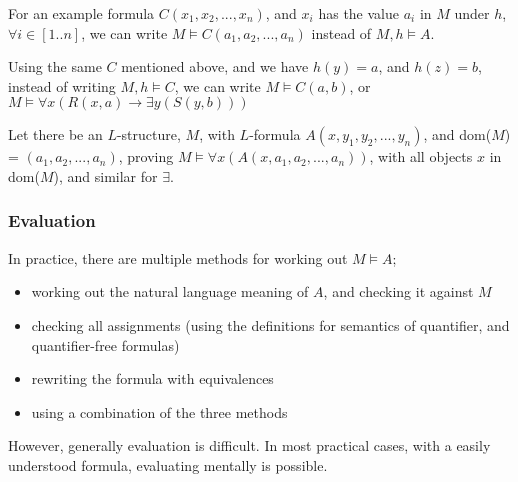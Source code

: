 \documentclass[a4paper, 12pt]{article}
\begin{document}
                For an example formula $C(x_1, x_2, ..., x_n)$, and $x_i$ has the value $a_i$ in $M$ under $h$, $\forall i \in [1..n]$, we can write $M \vDash C(a_1, a_2, ..., a_n)$ instead of $M, h \vDash A$.
                \medskip

                Using the same $C$ mentioned above, and we have $h(y) = a$, and $h(z) = b$, instead of writing $M, h \vDash C$, we can write $M \vDash C(a, b)$, or $M \vDash \forall x (R(x, a) \rightarrow \exists y (S(y, b)))$
                \medskip

                Let there be an $L$-structure, $M$, with $L$-formula $A(x, y_1, y_2, ..., y_n)$, and dom($M$) = $(a_1, a_2, ..., a_n)$, proving $M \vDash \forall x (A(x, a_1, a_2, ..., a_n))$, with all objects $x$ in dom($M$), and similar for $\exists$.
            \subsubsection*{Evaluation}
                In practice, there are multiple methods for working out $M \vDash A$;
                \begin{itemize}
                    \itemsep0em
                    \item working out the natural language meaning of $A$, and checking it against $M$
                    \item checking all assignments (using the definitions for semantics of quantifier, and quantifier-free formulas)
                    \item rewriting the formula with equivalences
                    \item using a combination of the three methods
                \end{itemize}
                However, generally evaluation is difficult. In most practical cases, with a easily understood formula, evaluating mentally is possible.
\end{document}
